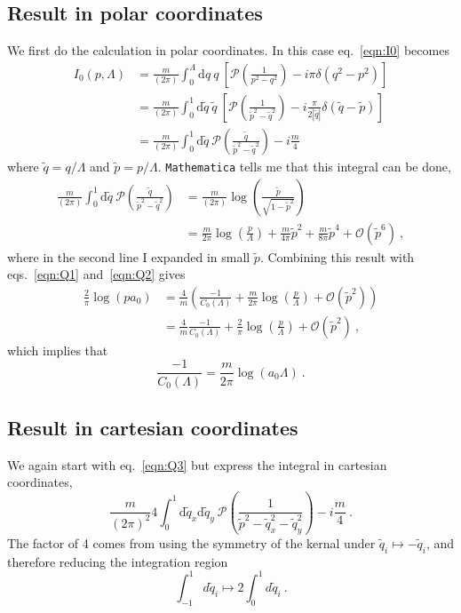 \subsection{Result in polar coordinates}
We first do the calculation in polar coordinates.  In this case eq.~\eqref{eqn:I0} becomes
\begin{align}
I_0(p,\Lambda)&=\frac{m}{(2 \pi)} \int^{\Lambda}_0 \mathrm{d}q \ q\ \left[\mathcal{P}\left(\frac{1}{p^2-q^{2}}\right)-i \pi \delta(q^2-p^2)\right]\\
&=\frac{m}{(2 \pi)} \int^{1}_0 \mathrm{d}\tilde q\  \tilde q\ \left[\mathcal{P}\left(\frac{1}{\tilde p^2-\tilde q^{2}}\right)-i \frac{\pi}{2|\tilde q|} \delta( \tilde q-\tilde p)\right]\\
&=\frac{m}{(2 \pi)} \int^{1}_0 \mathrm{d}\tilde q\ \mathcal{P}\left(\frac{\tilde q}{\tilde p^2-\tilde q^{2}}\right)-i \frac{m}{4}  \,\label{eqn:Q3}
\end{align}
where $\tilde q=q/\Lambda$ and $\tilde p=p/\Lambda$.  \texttt{Mathematica} tells me that this integral can be done,
\begin{align}
\frac{m}{(2 \pi)} \int^{1}_0 \mathrm{d}\tilde q\ \mathcal{P}\left(\frac{\tilde q}{\tilde p^2-\tilde q^{2}}\right)&=
\frac{m}{(2 \pi)} \log\left(\frac{\tilde p}{\sqrt{1-\tilde p^2}}\right)\\
&=\frac{m}{2 \pi} \log\left(\frac{p}{\Lambda}\right)+\frac{m}{4 \pi}\tilde p^2+\frac{m}{8 \pi}\tilde p^4+\mathcal{O}(\tilde p^6)\ ,
\end{align}
where in the second line I expanded in small $\tilde p$. Combining this result with eqs.~\eqref{eqn:Q1} and~\eqref{eqn:Q2} gives
\begin{align}
\frac{2}{\pi}\log(p a_0)&=\frac{4}{m} \left(\frac{-1}{C_{0}(\Lambda)}+\frac{m}{2 \pi} \log\left(\frac{p}{\Lambda}\right)+\mathcal{O}(\tilde p^2)\right)\nonumber\\
&=\frac{4}{m} \frac{-1}{C_{0}(\Lambda)}+\frac{2}{\pi}\log\left(\frac{p}{\Lambda}\right)+\mathcal{O}(\tilde p^2)\ ,
\end{align}
which implies that
\begin{equation}
 \frac{-1}{C_{0}(\Lambda)}=\frac{m}{2\pi}\log\left(a_0\Lambda\right)\ .
 \end{equation}

  
 \subsection{Result in cartesian coordinates}
We again start with eq.~\eqref{eqn:Q3} but express the integral in cartesian coordinates,
 \begin{equation}
 \frac{m}{(2 \pi)^2}4 \int^{1}_0 \mathrm{d}\tilde q_x\mathrm{d}\tilde q_y\ \mathcal{P}\left(\frac{1}{\tilde p^2-\tilde q_x^{2}-\tilde q_y^{2}}\right)-i \frac{m}{4} \ .
 \end{equation}
 The factor of 4 comes from using the symmetry of the kernal under $\tilde q_i\mapsto-\tilde q_i$, and therefore reducing the integration region
 \begin{displaymath}
 \int_{-1}^1d\tilde q_i\mapsto2\int_0^1d\tilde q_i\ .
 \end{displaymath}
 
